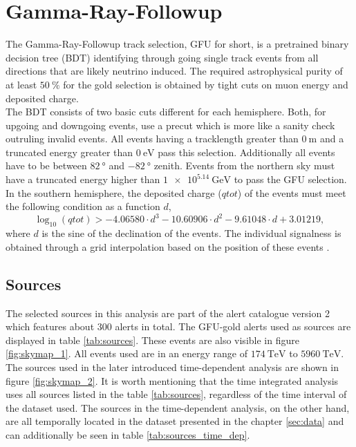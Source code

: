 \section{Gamma-Ray-Followup}

The Gamma-Ray-Followup track selection, GFU for short, is a pretrained binary decision tree (BDT) identifying through going single track events from all directions that are likely neutrino induced.
The required astrophysical purity of at least $\SI{50}{\percent}$ for the gold selection is obtained by tight cuts on muon energy and deposited charge.\\
The BDT consists of two basic cuts different for each hemisphere.
Both, for upgoing and downgoing events, use a precut which is more like a sanity check outruling invalid events.
All events having a tracklength greater than $\SI{0}{\meter}$ and a truncated energy greater than $\SI{0}{\electronvolt}$ pass this selection.
Additionally all events have to be between $\SI{82}{\degree}$ and $\SI{-82}{\degree}$ zenith.
Events from the northern sky must have a truncated energy higher than $\SI{1e5.14}{\giga\electronvolt}$ to pass the GFU selection.
In the southern hemisphere, the deposited charge ($qtot$) of the events must meet the following condition as a function $d$,
\begin{equation}
  \log_{10}(qtot) > -4.06580\cdot d^3 - 10.60906\cdot d^2  -9.61048\cdot d + 3.01219,
\end{equation}
where $d$ is the sine of the declination of the events.
The individual signalness is obtained through a grid interpolation based on the position of these events \cite{track_alert_paper}.

\subsection{Sources}

The selected sources in this analysis are part of the alert catalogue version 2 which features about 300 alerts in total.
The GFU-gold alerts used as sources are displayed in table \ref{tab:sources}.
These events are also visible in figure \ref{fig:skymap_1}.
All events used are in an energy range of $\SI{174}{\tera\electronvolt}$ to $\SI{5960}{\tera\electronvolt}$.
The sources used in the later introduced time-dependent analysis are shown in figure \ref{fig:skymap_2}.
It is worth mentioning that the time integrated analysis uses all sources listed in the table \ref{tab:sources}, regardless of the time interval of the dataset used.
The sources in the time-dependent analysis, on the other hand, are all temporally located in the dataset presented in the chapter \ref{sec:data} and can additionally be seen in table \ref{tab:sources_time_dep}.

